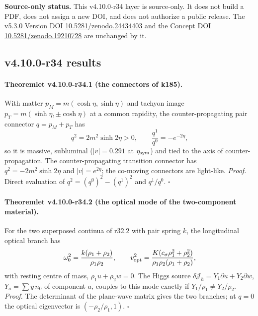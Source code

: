 \noindent\textbf{Source-only status.}
This v4.10.0-r34 layer is source-only.  It does not build a PDF, does not assign a new DOI,
and does not authorize a public release.  The v5.3.0 Version DOI
\href{https://doi.org/10.5281/zenodo.24434403}{10.5281/zenodo.24434403} and the Concept DOI
\href{https://doi.org/10.5281/zenodo.19210728}{10.5281/zenodo.19210728} are unchanged by it.

\subsection*{v4.10.0-r34 results}
\label{subsec:v4100-r34-results}

\paragraph{Theoremlet v4.10.0-r34.1 (the connectors of k185).}
With matter \(p_M=m(\cosh\eta,\sinh\eta)\) and tachyon image \(p_T=m(\sinh\eta,\pm\cosh\eta)\) at a common rapidity, the counter-propagating pair
connector \(q=p_M+p_T\) has
\[
 q^2=2m^2\sinh2\eta>0,\qquad \frac{q^1}{q^0}=-e^{-2\eta},
\]
so it is massive, subluminal (\(|v|=0.291\) at \(\eta_{\rm sym}\)) and tied to the axis of counter-propagation.  The counter-propagating
transition connector has \(q^2=-2m^2\sinh2\eta\) and \(|v|=e^{2\eta}\); the co-moving connectors are light-like.  \emph{Proof.} Direct
evaluation of \(q^2=(q^0)^2-(q^1)^2\) and \(q^1/q^0\).  \(\square\)

\paragraph{Theoremlet v4.10.0-r34.2 (the optical mode of the two-component material).}
For the two superposed continua of r32.2 with pair spring \(k\), the longitudinal optical branch has
\[
 \omega_0^2=\frac{k(\rho_1+\rho_2)}{\rho_1\rho_2},\qquad
 v_{\rm opt}^2=\frac{K(c_\sigma\rho_1^2+\rho_2^2)}{\rho_1\rho_2(\rho_1+\rho_2)},
\]
with resting centre of mass, \(\rho_1u+\rho_2w=0\).  The Higgs source \(\delta\mathcal J_h=Y_1\partial u+Y_2\partial w\), \(Y_a=\sum y\,n_0\) of component \(a\),
couples to this mode exactly if \(Y_1/\rho_1\neq Y_2/\rho_2\).  \emph{Proof.} The determinant of the plane-wave matrix gives the two
branches; at \(q=0\) the optical eigenvector is \((-\rho_2/\rho_1,1)\).  \(\square\)

